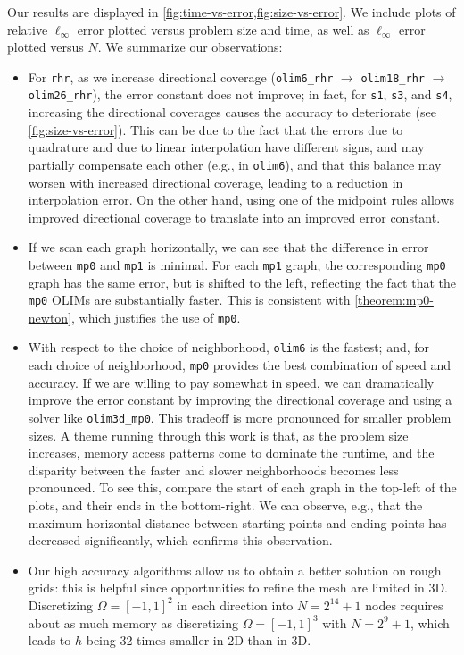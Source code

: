 \documentclass[sisc-eikonal.tex]{subfiles}
\begin{document}
Our results are displayed in
\cref{fig:time-vs-error,fig:size-vs-error}. We include plots of
relative $\ell_\infty$ error plotted versus problem size and time, as
well as $\ell_\infty$ error plotted versus $N$. We summarize our
observations:
\begin{itemize}
\item For \texttt{rhr}, as we increase directional coverage
  (\texttt{olim6\_rhr} $\to$ \texttt{olim18\_rhr} $\to$
  \texttt{olim26\_rhr}), the error constant does not improve; in fact,
  for \texttt{s1}, \texttt{s3}, and \texttt{s4}, increasing the
  directional coverages causes the accuracy to deteriorate (see
  \cref{fig:size-vs-error}). This can be due to the fact that the
  errors due to quadrature and due to linear interpolation have
  different signs, and may partially compensate each other (e.g., in
  \texttt{olim6}), and that this balance may worsen with increased
  directional coverage, leading to a reduction in interpolation error.
  On the other hand, using one of the midpoint rules allows improved
  directional coverage to translate into an improved error constant.
\item If we scan each graph horizontally, we can see that the
  difference in error between \texttt{mp0} and \texttt{mp1} is
  minimal. For each \texttt{mp1} graph, the corresponding \texttt{mp0}
  graph has the same error, but is shifted to the left, reflecting the
  fact that the \texttt{mp0} OLIMs are substantially faster. This is
  consistent with \cref{theorem:mp0-newton}, which justifies the use
  of \texttt{mp0}.
\item With respect to the choice of neighborhood, \texttt{olim6} is
  the fastest; and, for each choice of neighborhood, \texttt{mp0}
  provides the best combination of speed and accuracy. If we are
  willing to pay somewhat in speed, we can dramatically improve the
  error constant by improving the directional coverage and using a
  solver like \texttt{olim3d\_mp0}. This tradeoff is more pronounced
  for smaller problem sizes. A theme running through this work is
  that, as the problem size increases, memory access patterns come to
  dominate the runtime, and the disparity between the faster and
  slower neighborhoods becomes less pronounced. To see this, compare
  the start of each graph in the top-left of the plots, and their ends
  in the bottom-right. We can observe, e.g., that the maximum
  horizontal distance between starting points and ending points has
  decreased significantly, which confirms this observation.
\item Our high accuracy algorithms allow us to obtain a better
  solution on rough grids: this is helpful since opportunities to
  refine the mesh are limited in 3D. Discretizing $\Omega = [-1, 1]^2$
  in each direction into $N = 2^{14} + 1$ nodes requires about as much
  memory as discretizing $\Omega = [-1, 1]^3$ with $N = 2^{9} + 1$,
  which leads to $h$ being 32 times smaller in 2D than in 3D.
\end{itemize}
\end{document}
